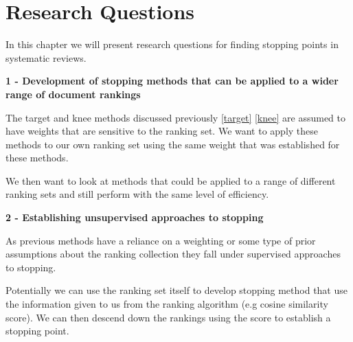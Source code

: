\chapter{Research Questions} \label{rq}

In this chapter we will present research questions for finding stopping points in systematic reviews.

\textbf{1 - Development of stopping methods that can be applied to a wider range of document rankings} \label{sm}

The target and knee methods discussed previously \ref{target} \ref{knee} are assumed to have weights that are sensitive to the ranking set. We want to apply these methods to our own ranking set using the same weight that was established for these methods. 

We then want to look at methods that could be applied to a range of different ranking sets and still perform with the same level of efficiency. 

\textbf{2 - Establishing unsupervised approaches to stopping} \label{sm}

As previous methods have a reliance on a weighting or some type of prior assumptions about the ranking collection they fall under supervised approaches to stopping.

Potentially we can use the ranking set itself to develop stopping method that use the information given to us from the ranking algorithm (e.g cosine similarity score). We can then descend down the rankings using the score to establish a stopping point.





